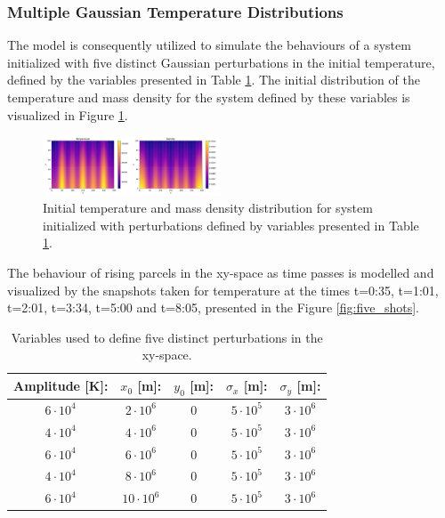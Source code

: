 \documentclass[10pt, nofootinbib, twocolumn]{revtex4-1}
\begin{document}
\subsubsection{Multiple Gaussian Temperature Distributions}
The model is consequently utilized to simulate the behaviours of a system initialized with five distinct Gaussian perturbations in the initial temperature, defined by the variables presented in Table \ref{tab:six}. 
The initial distribution of the temperature and mass density for the system defined by these variables is visualized in Figure \ref{fig:five_initial}. \\
\begin{figure}[H]
    \centering
    \includegraphics[width =0.47\textwidth]{figures/initial_two_five.pdf} 
    \caption{Initial temperature and mass density distribution for system initialized with perturbations defined by variables presented in Table \ref{tab:six}.}
    \label{fig:five_initial}
\end{figure}

The behaviour of rising parcels in the xy-space as time passes is modelled and visualized by the snapshots taken for temperature at the times t=0:35, t=1:01, t=2:01, t=3:34, t=5:00 and t=8:05, presented in the Figure \ref{fig:five_shots}.%
\begin{table}[H]
\caption{Variables used to define five distinct perturbations in the xy-space.}
    \begin{tabular*}{0.47\textwidth}{@{\extracolsep{\fill}}ccccc}
    \toprule
    \textbf{Amplitude [K]:} &  \textbf{$x_0$ [m]:}  & \textbf{$y_0$ [m]:} &  \textbf{$\sigma_x$ [m]:} &  \textbf{$\sigma_y$ [m]:}  \\
    \hline
    $6\cdot 10^4$  &  $2\cdot 10^6$    & $0$ & $5\cdot 10^5$ &$3\cdot 10^6$ \\
    $4\cdot 10^4$  &  $4\cdot 10^6$    & $0$ & $5\cdot 10^5$ &$3\cdot 10^6$ \\
    $6\cdot 10^4$  &  $6\cdot 10^6$  & $0$ & $5\cdot 10^5$ &$3\cdot 10^6$ \\
    $4\cdot 10^4$  &  $8\cdot 10^6$    & $0$ & $5\cdot 10^5$ &$3\cdot 10^6$ \\
    $6\cdot 10^4$  &  $10\cdot 10^6$   & $0$ & $5\cdot 10^5$ &$3\cdot 10^6$ \\
    \end{tabular*}
    \label{tab:six}
\end{table}
\end{document}
